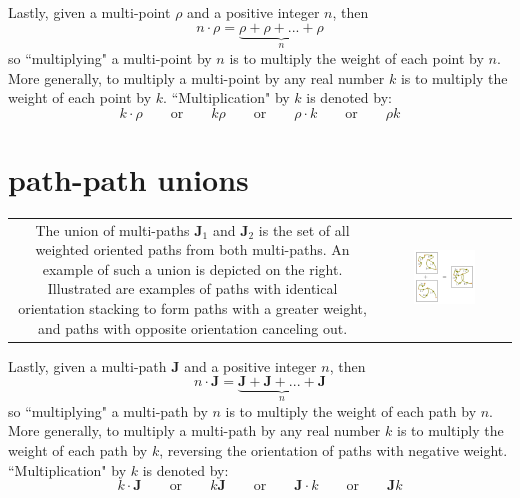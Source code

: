 Lastly, given a multi-point \(\rho\) and a positive integer \(n\), then
\[n \cdot \rho = \underbrace{\rho + \rho + ... + \rho}_n\]
so ``multiplying" a multi-point by \(n\) is to multiply the weight of each point by \(n\). More generally, to multiply a multi-point by any real number \(k\) is to multiply the weight of each point by \(k\). ``Multiplication" by \(k\) is denoted by:
\[k \cdot \rho \quad\quad\text{or}\quad\quad k\rho \quad\quad\text{or}\quad\quad \rho \cdot k \quad\quad\text{or}\quad\quad \rho k\]


\section{path-path unions}

\vspace{5mm}

\begin{tabular}{cc}
\parbox{0.5\textwidth}{
The union of multi-paths \(\mathbf{J}_1\) and \(\mathbf{J}_2\) is the set of all weighted oriented paths from both multi-paths. An example of such a union is depicted on the right. Illustrated are examples of paths with identical orientation stacking to form paths with a greater weight, and paths with opposite orientation canceling out.
} & \parbox{0.5\textwidth}{
\includegraphics[width = 0.5\textwidth]{Unions/multipath_unions}
}
\end{tabular}

Lastly, given a multi-path \(\mathbf{J}\) and a positive integer \(n\), then
\[n \cdot \mathbf{J} = \underbrace{\mathbf{J} + \mathbf{J} + ... + \mathbf{J}}_n\]
so ``multiplying" a multi-path by \(n\) is to multiply the weight of each path by \(n\). More generally, to multiply a multi-path by any real number \(k\) is to multiply the weight of each path by \(k\), reversing the orientation of paths with negative weight. ``Multiplication" by \(k\) is denoted by:
\[k \cdot \mathbf{J} \quad\quad\text{or}\quad\quad k\mathbf{J} \quad\quad\text{or}\quad\quad \mathbf{J} \cdot k \quad\quad\text{or}\quad\quad \mathbf{J} k\]


